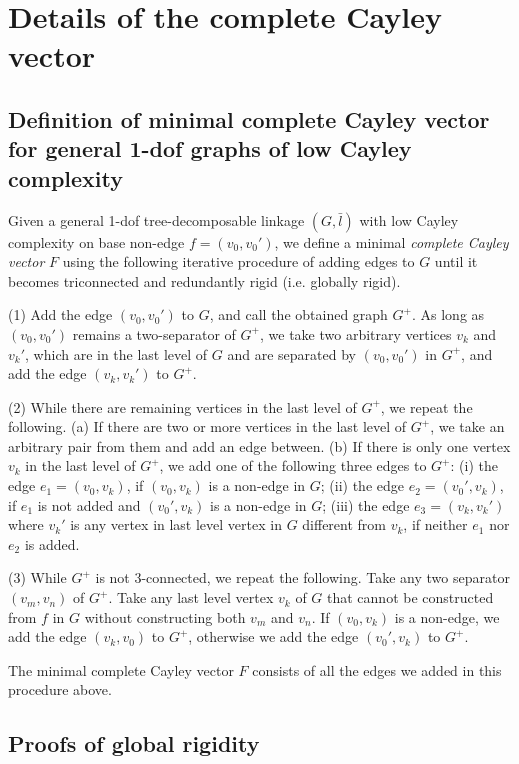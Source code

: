 \documentclass[secthm,amsthm,english]{article}
\theoremstyle{definition}
\theoremstyle{remark}
\begin{document}
\section{Details of the complete Cayley vector}
\label{app:cayley_vector}

\subsection{Definition of minimal complete Cayley vector for general 1-dof graphs of low Cayley complexity}

Given a general 1-dof tree-decomposable linkage $(G,\bar{l})$ with low Cayley complexity on base non-edge $f = (v_0,v_0')$,
we define a minimal \emph{complete Cayley vector} $F$ using the following iterative procedure
of adding edges to $G$ until it becomes triconnected and redundantly rigid (i.e. globally rigid).

\noindent (1) 
Add the edge $(v_0,v_0')$ to $G$, and call the obtained graph $G^+$. 
As long as $(v_0,v_0')$ remains a two-separator of $G^+$, 
we take two arbitrary vertices $v_k$ and $v_k'$,
which are in the last level of $G$ and are separated by $(v_0,v_0')$ in $G^+$, 
and add the edge $(v_k,v_k')$ to $G^+$. 

\noindent (2) While there are remaining vertices in the last level of $G^+$, we repeat the following.
(a) If there are two or more vertices in the last level of $G^+$, we take an arbitrary pair from them and add an edge between.
(b) If there is only one vertex $v_k$ in the last level of $G^+$, 
we add one of the following three edges to $G^+$: 
(i) the edge $e_1 = (v_0,v_k)$, if $(v_0, v_k)$ is a non-edge in $G$; 
(ii) the edge $e_2 = (v_0',v_k)$, if $e_1$ is not added and $(v_0',v_k)$ is a non-edge in $G$;
(iii) the edge $e_3 = (v_k,v_k')$ where $v_k'$ is any vertex in last level vertex in $G$ different from $v_k$, if neither $e_1$ nor $e_2$ is added.

\noindent (3) While $G^+$ is not 3-connected, we repeat the following. 
Take any two separator $(v_m,v_n)$ of $G^+$. 
Take any last level vertex $v_k$ of $G$ that cannot be constructed from $f$ in $G$ without constructing both $v_m$ and $v_n$. 
If $(v_0,v_k)$ is a non-edge, we add the edge $(v_k,v_0)$ to $G^+$, otherwise we add the edge $(v_0',v_k)$ to $G^+$. 

The minimal complete Cayley vector $F$ consists of all the edges we added in this procedure above. 


\subsection{Proofs of global rigidity}
\end{document}
